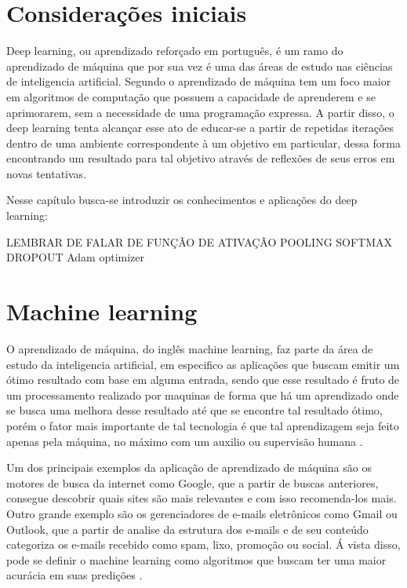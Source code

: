 \section{Considerações iniciais}

Deep learning, ou aprendizado reforçado em português, é um ramo do aprendizado de máquina que por sua vez é uma das áreas de estudo nas ciências de inteligencia artificial. Segundo  o aprendizado de máquina tem um foco maior em algoritmos de computação que possuem a capacidade de aprenderem e se aprimorarem, sem a necessidade de uma programação expressa.
A partir disso, o deep learning tenta alcançar esse ato de educar-se a partir de repetidas iterações dentro de uma ambiente correspondente à um objetivo em particular, dessa forma encontrando um resultado para tal objetivo através de reflexões de seus erros em novas tentativas.

Nesse capítulo busca-se introduzir os conhecimentos e aplicações do deep learning:

LEMBRAR DE FALAR DE FUNÇÃO DE ATIVAÇÃO
POOLING
SOFTMAX
DROPOUT
Adam optimizer

\section{Machine learning}

O aprendizado de máquina, do inglês machine learning, faz parte da área de estudo da inteligencia artificial, em especifico as aplicações que buscam emitir um ótimo resultado com base em alguma entrada, sendo que esse resultado é fruto de um processamento realizado por maquinas de forma que há um aprendizado onde se busca uma melhora desse resultado até que se encontre tal resultado ótimo, porém o fator mais importante de tal tecnologia é que tal aprendizagem seja feito apenas pela máquina, no máximo com um auxilio ou supervisão humana .

Um dos principais exemplos da aplicação de aprendizado de máquina são os motores de busca da internet como Google, que a partir de buscas anteriores, consegue descobrir quais sites são mais relevantes e com isso recomenda-los mais. 
Outro grande exemplo são os gerenciadores de e-mails eletrônicos como Gmail ou Outlook, que a partir de analise da estrutura dos e-mails e de seu conteúdo categoriza os e-mails recebido como spam, lixo, promoção ou social. 
Á vista disso, pode se definir o machine learning como algoritmos que buscam ter uma maior acurácia em suas predições \cite{ed2021}.

